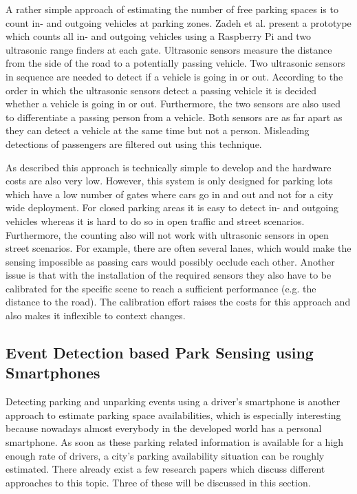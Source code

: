 A rather simple approach of estimating the number of free parking spaces is to count in- and outgoing vehicles at parking zones. Zadeh et al. \cite{smarturbanparkingdetection} present a prototype which counts all in- and outgoing vehicles using a Raspberry Pi and two ultrasonic range finders at each gate. Ultrasonic sensors measure the distance from the side of the road to a potentially passing vehicle. Two ultrasonic sensors in sequence are needed to detect if a vehicle is going in or out. According to the order in which the ultrasonic sensors detect a passing vehicle it is decided whether a vehicle is going in or out. Furthermore,
the two sensors are also used to differentiate a passing person from a vehicle. Both sensors are as far apart as they can detect a vehicle at the same time but not a person. Misleading detections of passengers are filtered out using this technique.

As described this approach is technically simple to develop and the hardware costs are also very low. However, this system is only designed for parking lots which have a low number of gates where cars go in and out and not for a city wide deployment. For closed parking areas it is easy to detect in- and outgoing vehicles whereas it is hard to do so in open traffic and street scenarios. Furthermore, the counting also will not work with ultrasonic sensors in open street scenarios. For example, there are often several lanes, which would make the sensing impossible as passing cars would possibly occlude each other. Another issue is that with the installation of the required sensors they also have to be calibrated for the specific scene to reach a sufficient performance (e.g. the distance to the road). The calibration effort raises the costs for this approach and also makes it inflexible to context changes.







\subsection{Event Detection based Park Sensing using Smartphones}
\label{sec:event_detection_park_sensing}

Detecting parking and unparking events using a driver's smartphone is another approach to estimate parking space availabilities, which is especially interesting because nowadays almost everybody in the developed world has a personal smartphone. As soon as these parking related information is available for a high enough rate of drivers, a city's parking availability situation can be roughly estimated. There already exist a few research papers which discuss different approaches to this topic. Three of these will be discussed in this
section.

